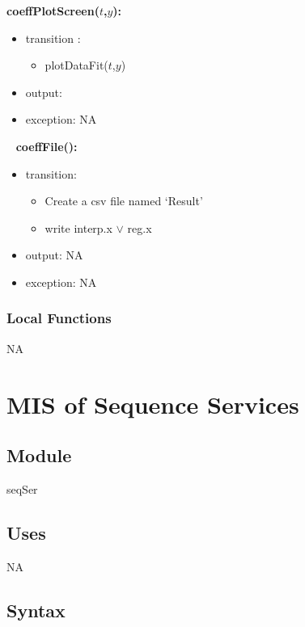 \documentclass[12pt, titlepage]{article}
\begin{document}
\noindent \textbf{coeffPlotScreen($t$,$y$):}
\begin{itemize}
	\item transition :
	\begin{itemize}
		\item plotDataFit($t$,$y$)
	\end{itemize}
	\item output:  
	\item exception: NA
\end{itemize}


~\newline
\noindent \textbf{coeffFile():}
\begin{itemize}
	\item transition: 
	\begin{itemize}
		
		\item Create a csv file named `Result'
		\item write interp.x $\lor$ reg.x
	\end{itemize}
	\item output: NA
	\item exception: NA 
\end{itemize}

\subsubsection{Local Functions}

NA



\section{MIS of Sequence Services} \label{seqSer} 

\subsection{Module}

seqSer 

\subsection{Uses} 
NA
\subsection{Syntax}
\end{document}
